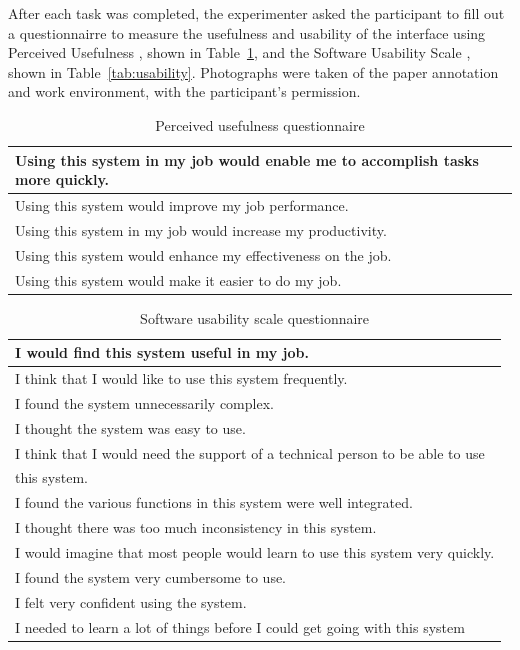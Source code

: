 
After each task was completed, the experimenter asked the participant to fill out a questionnairre to measure the
usefulness and usability of the interface using Perceived Usefulness \citep{Davis1989}, shown in
Table~\ref{tab:usefulness}, and the Software Usability Scale \citep{Brooke1996}, shown in Table~\ref{tab:usability}.
Photographs were taken of the paper annotation and work environment, with the participant's permission.

\begin{table}
  {\small
    \begin{tabular}{ | l | }
      \hline
      Using this system in my job would enable me to accomplish tasks more quickly. \\ \hline
      Using this system would improve my job performance. \\ \hline
      Using this system in my job would increase my productivity. \\ \hline
      Using this system would enhance my effectiveness on the job. \\ \hline
      Using this system would make it easier to do my job. \\
      \hline
    \end{tabular}
  }
  \caption{Perceived usefulness questionnaire \citep{Davis1989}}
  \label{tab:usefulness}
\end{table}

\begin{table}
  {\small
    \begin{tabular}{ | l | }
      \hline
      I would find this system useful in my job. \\ \hline
      I think that I would like to use this system frequently. \\ \hline
      I found the system unnecessarily complex. \\ \hline
      I thought the system was easy to use. \\ \hline
      I think that I would need the support of a technical person to be able to use \\
      this system. \\ \hline
      I found the various functions in this system were well integrated. \\ \hline
      I thought there was too much inconsistency in this system. \\ \hline
      I would imagine that most people would learn to use this system very quickly. \\ \hline
      I found the system very cumbersome to use. \\ \hline
      I felt very confident using the system. \\ \hline
      I needed to learn a lot of things before I could get going with this system \\
      \hline
    \end{tabular}
  }
  \caption{Software usability scale questionnaire \citep{Brooke1996}}
  \label{tab:sus}
\end{table}


